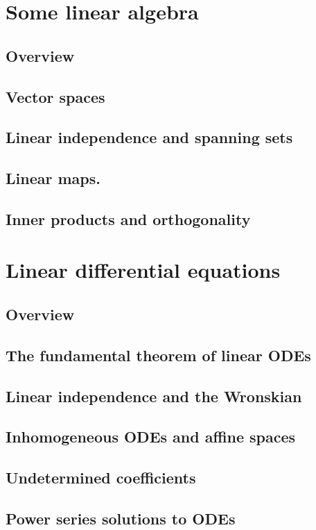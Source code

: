 \documentclass{article}
\begin{document}
\pagebreak

\section{Some linear algebra}
\subsection*{Overview}
\subsection{Vector spaces}
\subsection{Linear independence and spanning sets}
\subsection{Linear maps.}
\subsection{Inner products and orthogonality}
\pagebreak
\section{Linear differential equations}
\subsection*{Overview}
\subsection{The fundamental theorem of linear ODEs}
\subsection{Linear independence and the Wronskian}
\subsection{Inhomogeneous ODEs and affine spaces}
\subsection{Undetermined coefficients}
\subsection{Power series solutions to ODEs}
\end{document}
